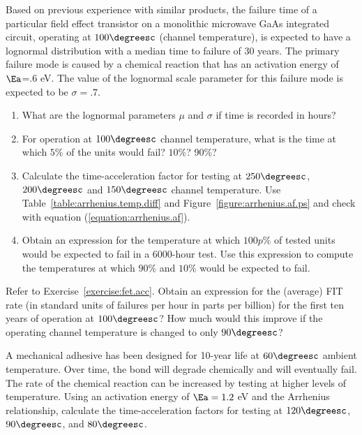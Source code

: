 \begin{exercise}
\label{exercise:fet.acc}
Based on previous experience with similar products, the failure time
of a particular field effect transistor on a monolithic microwave GaAs
integrated circuit, operating at $100\degreesc$ (channel temperature),
is expected to have a lognormal distribution with a median time to
failure of 30 years. The primary failure mode is caused by a chemical
reaction that has an activation energy of $\Ea$=.6 eV. The value of the
lognormal scale parameter for this failure mode is expected to be
$\sigma=.7$.
\begin{enumerate}
\item
What are the lognormal parameters $\mu$ and $\sigma$ if time is
recorded in hours?
\item
For operation at $100\degreesc$ channel temperature, what is the time at which
$5\%$ of the units would fail? $10\%$? 90\%?
\item
Calculate the time-acceleration factor for testing at $250\degreesc$,
$200\degreesc$ and $150\degreesc$ channel temperature. Use
Table~\ref{table:arrhenius.temp.diff} and
Figure~\ref{figure:arrhenius.af.ps} and check with equation
(\ref{equation:arrhenius.af}).
\item
Obtain an expression for the temperature at which $100p\%$ of tested
units would be expected to fail in a 6000-hour test. Use this
expression to compute the temperatures at which $90\%$ and $10\%$
would be expected to fail.
\end{enumerate}
\end{exercise}


\begin{exercise}
Refer to Exercise~\ref{exercise:fet.acc}.  Obtain an expression for
the (average) FIT rate (in standard units of failures per hour in
parts per billion) for the first ten years of operation at
$100\degreesc$? How much would this improve if the operating channel
temperature is changed to only $90\degreesc$?
\end{exercise}


\begin{exercise}
\label{exercise:mech.adhesive}
A mechanical adhesive has been designed for 10-year life at 
$60 \degreesc$ ambient temperature. Over time, the bond will degrade
chemically and will eventually fail. The rate of the chemical
reaction can be increased by testing at higher levels of temperature.
Using an activation energy of $\Ea=1.2$ eV and the Arrhenius relationship,
calculate the time-acceleration factors for testing at
$120 \degreesc$, $90\degreesc$, and $80\degreesc$.
\end{exercise}


